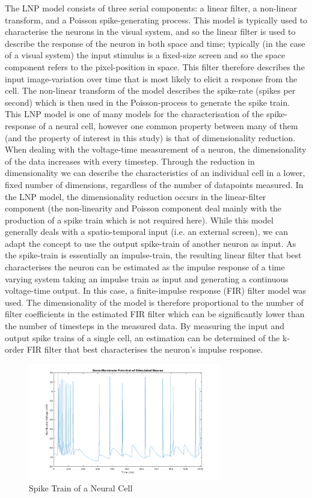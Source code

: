 The LNP model consists of three serial components: a linear filter, a non-linear transform, and a Poisson spike-generating process. This model is typically used to characterise the neurons in the visual system, and so the linear filter is used to describe the response of the neuron in both space and time; typically (in the case of a visual system) the input stimulus is a fixed-size screen and so the space component refers to the pixel-position in space. This filter therefore describes the input image-variation over time that is most likely to elicit a response from the cell. The non-linear transform of the model describes the spike-rate (spikes per second) which is then used in the Poisson-process to generate the spike train. This LNP model is one of many models for the characterisation of the spike-response of a neural cell, however one common property between many of them (and the property of interest in this study) is that of dimensionality reduction. When dealing with the voltage-time measurement of a neuron, the dimensionality of the data increases with every timestep. Through the reduction in dimensionality we can describe the characteristics of an individual cell in a lower, fixed number of dimensions, regardless of the number of datapoints measured. In the LNP model, the dimensionality reduction occurs in the linear-filter component (the non-linearity and Poisson component deal mainly with the production of a spike train which is not required here). While this model generally deals with a spatio-temporal input (i.e. an external screen), we can adapt the concept to use the output spike-train of another neuron as input. As the spike-train is essentially an impulse-train, the resulting linear filter that best characterises the neuron can be estimated as the impulse response of a time varying system taking an impulse train as input and generating a continuous voltage-time output. In this case, a finite-impulse response (FIR) filter model was used. The dimensionality of the model is therefore proportional to the number of filter coefficients in the estimated FIR filter which can be significantly lower than the number of timesteps in the measured data. By measuring the input and output spike trains of a single cell, an estimation can be determined of the k-order FIR filter that best characterises the neuron's impulse response.
\begin{figure}[ht]
    \centering
    \includegraphics[width=0.75\textwidth]{02-Background/sampleSpikeTrain.png}
    \caption{Spike Train of a Neural Cell}
    \label{image:sampleSpike}
\end{figure}

